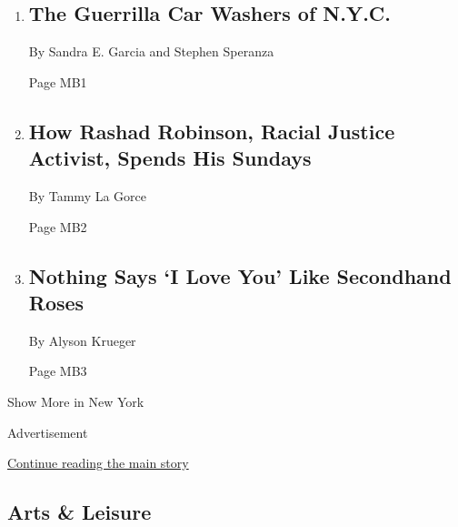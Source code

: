 \begin{enumerate}
\def\labelenumi{\arabic{enumi}.}
\item
  \href{/2020/02/14/nyregion/nyc-mobile-car-wash.html}{}

  \hypertarget{the-guerrilla-car-washers-of-nyc}{%
  \subsection{The Guerrilla Car Washers of
  N.Y.C.}\label{the-guerrilla-car-washers-of-nyc}}

  By Sandra E. Garcia and Stephen Speranza

  Page MB1
\item
  \href{/2020/02/14/nyregion/rashad-robinson.html}{}

  \hypertarget{how-rashad-robinson-racial-justice-activist-spends-his-sundays}{%
  \subsection{How Rashad Robinson, Racial Justice Activist, Spends His
  Sundays}\label{how-rashad-robinson-racial-justice-activist-spends-his-sundays}}

  By Tammy La Gorce

  Page MB2
\item
  \href{/2020/02/12/nyregion/flowers-valentines-day-environment.html}{}

  \hypertarget{nothing-says-i-love-you-like-secondhand-roses}{%
  \subsection{Nothing Says `I Love You' Like Secondhand
  Roses}\label{nothing-says-i-love-you-like-secondhand-roses}}

  By Alyson Krueger

  Page MB3
\end{enumerate}

Show More in New York

Advertisement

\protect\hyperlink{after-mid3}{Continue reading the main story}

\hypertarget{arts--leisure}{%
\subsection{Arts \& Leisure}\label{arts--leisure}}

